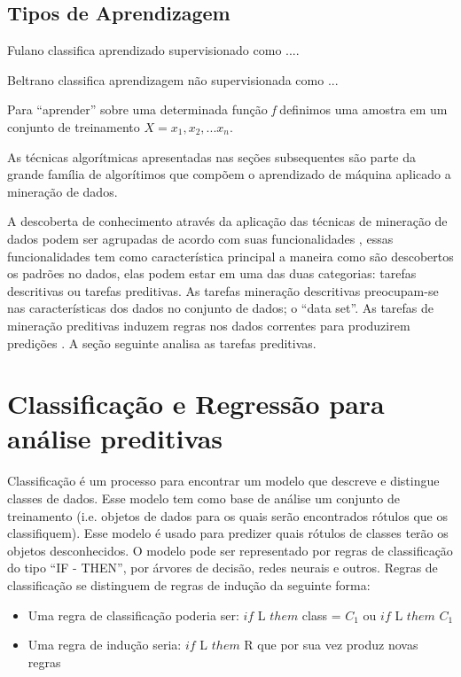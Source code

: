 \subsection{Tipos de Aprendizagem}

\color{blue} {Fulano classifica aprendizado supervisionado como .... }

\color{red} {Beltrano classifica aprendizagem não supervisionada como ...}

\color{black}

Para ``aprender'' sobre uma determinada função \textit{f} definimos uma amostra em um conjunto de treinamento $X = {x_{1}, x_{2}, ...x_{n}}$.







As técnicas algorítmicas apresentadas nas seções subsequentes são parte da grande família de algorítimos que compõem 
o aprendizado de máquina aplicado a mineração de dados.

A descoberta de conhecimento através da aplicação das técnicas de mineração de dados podem ser agrupadas de acordo com suas funcionalidades \cite{DataMining2}, 
essas funcionalidades tem como característica principal a maneira como são descobertos os padrões no dados, elas podem estar 
em uma das duas categorias: tarefas descritivas ou tarefas preditivas. As tarefas mineração descritivas preocupam-se nas características 
dos dados no conjunto de dados; o ``data set''. As tarefas de mineração preditivas induzem regras nos dados correntes para produzirem 
predições \cite{DataMining2}. A seção seguinte analisa as tarefas preditivas.



\section{Classificação e Regressão para análise preditivas}

Classificação é um processo para encontrar um modelo que descreve e distingue classes de dados. 
Esse modelo tem como base de análise um conjunto de treinamento (i.e. objetos de dados para os quais 
serão encontrados rótulos que os classifiquem). 
Esse modelo é usado para predizer quais rótulos de classes terão os objetos desconhecidos.
O modelo pode ser representado por regras de classificação do tipo ``IF - THEN'', por árvores de decisão, redes neurais e outros. 
Regras de classificação se distinguem de regras de indução da seguinte forma:
\begin{itemize}
 \item Uma regra de classificação poderia ser: $if$ L $them$ class = $C_{1}$ ou $if$ L $them$  $C_{1}$
 \item Uma regra de indução seria: $ if$ L $them$ R que por sua vez produz novas regras 
\end{itemize}

